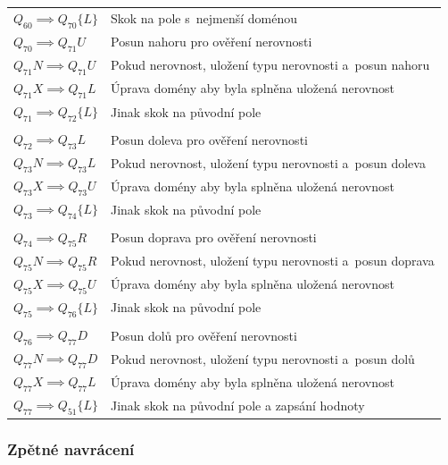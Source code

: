 \begin{tabular}{@{}p{4cm} p{10.5cm}@{}}
    \(Q_{60} \implies Q_{70}\{L\}\) & Skok na pole s~nejmenší doménou \\

    \(Q_{70} \implies Q_{71}U\) & Posun nahoru pro ověření nerovnosti \\
    \(Q_{71}N \implies Q_{71}U\) & Pokud nerovnost, uložení typu nerovnosti
        a~posun nahoru \\
    \(Q_{71}X \implies Q_{71}L\) & Úprava domény aby byla splněna uložená
        nerovnost \\
    \(Q_{71} \implies Q_{72}\{L\}\) & Jinak skok na původní pole \\
    & \\
    \(Q_{72} \implies Q_{73}L\) & Posun doleva pro ověření nerovnosti \\
    \(Q_{73}N \implies Q_{73}L\) & Pokud nerovnost, uložení typu nerovnosti
        a~posun doleva \\
    \(Q_{73}X \implies Q_{73}U\) & Úprava domény aby byla splněna uložená
        nerovnost \\
    \(Q_{73} \implies Q_{74}\{L\}\) & Jinak skok na původní pole \\
    & \\
    \(Q_{74} \implies Q_{75}R\) & Posun doprava pro ověření nerovnosti \\
    \(Q_{75}N \implies Q_{75}R\) & Pokud nerovnost, uložení typu nerovnosti
        a~posun doprava \\
    \(Q_{75}X \implies Q_{75}U\) & Úprava domény aby byla splněna uložená
        nerovnost \\
    \(Q_{75} \implies Q_{76}\{L\}\) & Jinak skok na původní pole \\
    & \\
    \(Q_{76} \implies Q_{77}D\) & Posun dolů pro ověření nerovnosti \\
    \(Q_{77}N \implies Q_{77}D\) & Pokud nerovnost, uložení typu nerovnosti
        a~posun dolů \\
    \(Q_{77}X \implies Q_{77}L\) & Úprava domény aby byla splněna uložená
        nerovnost\\
    \(Q_{77} \implies Q_{51}\{L\}\) & Jinak skok na původní pole a zapsání
        hodnoty \\
\end{tabular}

\subsubsection*{Zpětné navrácení}

